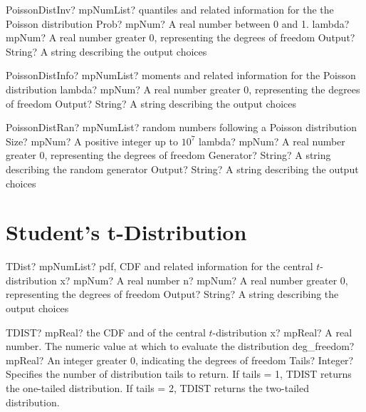 \documentclass[12pt,a4paper,openany]{book}
\begin{document}
\begin{mpFunctionsExtract}
\mpFunctionThreeNotImplemented
{PoissonDistInv? mpNumList? quantiles and related information for the the Poisson distribution}
{Prob? mpNum? A real number between 0 and 1.}
{lambda? mpNum? A real number greater 0, representing the degrees of freedom}
{Output? String? A string describing the output choices}
\end{mpFunctionsExtract}

\begin{mpFunctionsExtract}
\mpFunctionTwoNotImplemented
{PoissonDistInfo? mpNumList? moments and related information for the Poisson distribution}
{lambda? mpNum? A real number greater 0, representing the degrees of freedom}
{Output? String? A string describing the output choices}
\end{mpFunctionsExtract}

\begin{mpFunctionsExtract}
\mpFunctionFourNotImplemented
{PoissonDistRan? mpNumList? random numbers following a Poisson distribution}
{Size? mpNum? A positive integer up to $10^7$}
{lambda? mpNum? A real number greater 0, representing the degrees of freedom}
{Generator? String? A string describing the random generator}
{Output? String? A string describing the output choices}
\end{mpFunctionsExtract}

\section{Student's t-Distribution}

\begin{mpFunctionsExtract}
\mpFunctionThreeNotImplemented
{TDist? mpNumList? pdf, CDF and related information for the central $t$-distribution}
{x? mpNum? A real number}
{n? mpNum? A real number greater 0, representing the degrees of freedom}
{Output? String? A string describing the output choices}
\end{mpFunctionsExtract}

\begin{mpFunctionsExtract}
\mpWorksheetFunctionThreeNotImplemented
{TDIST? mpReal? the CDF and of the central $t$-distribution}
{x? mpReal? A real number. The numeric value at which to evaluate the distribution}
{deg\_freedom? mpReal? An integer  greater 0, indicating the degrees of freedom}
{Tails? Integer? Specifies the number of distribution tails to return. If tails = 1, TDIST returns the one-tailed distribution. If tails = 2, TDIST returns the two-tailed distribution.}
\end{mpFunctionsExtract}
\end{document}
